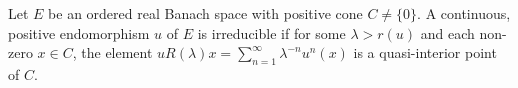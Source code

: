 Let $E$ be an ordered real Banach space with positive cone $C \neq \{0\}$. A continuous, positive endomorphism $u$ of $E$ is irreducible if for some $\lambda > r(u)$ and each non-zero $x \in C$, the element $uR(\lambda)x = \sum_{n=1}^{\infty} \lambda^{-n} u^n(x)$ is a quasi-interior point of $C$.

